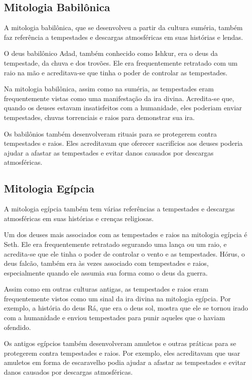 \documentclass[a4paper, 12pt, onecolumn,singlespacing]{article}
\begin{document}
	\subsection{Mitologia Babilônica}
	
	A mitologia babilônica, que se desenvolveu a partir da cultura suméria, também faz referência a tempestades e descargas atmosféricas em suas histórias e lendas.
	
	O deus babilônico Adad, também conhecido como Ishkur, era o deus da tempestade, da chuva e dos trovões. Ele era frequentemente retratado com um raio na mão e acreditava-se que tinha o poder de controlar as tempestades.
	
	Na mitologia babilônica, assim como na suméria, as tempestades eram frequentemente vistas como uma manifestação da ira divina. Acredita-se que, quando os deuses estavam insatisfeitos com a humanidade, eles poderiam enviar tempestades, chuvas torrenciais e raios para demonstrar sua ira.
	
	Os babilônios também desenvolveram rituais para se protegerem contra tempestades e raios. Eles acreditavam que oferecer sacrifícios aos deuses poderia ajudar a afastar as tempestades e evitar danos causados por descargas atmosféricas.
	
	\subsection{Mitologia Egípcia}
	
	A mitologia egípcia também tem várias referências a tempestades e descargas atmosféricas em suas histórias e crenças religiosas.
	
	Um dos deuses mais associados com as tempestades e raios na mitologia egípcia é Seth. Ele era frequentemente retratado segurando uma lança ou um raio, e acredita-se que ele tinha o poder de controlar o vento e as tempestades. Hórus, o deus falcão, também era às vezes associado com tempestades e raios, especialmente quando ele assumia sua forma como o deus da guerra.
	
	Assim como em outras culturas antigas, as tempestades e raios eram frequentemente vistos como um sinal da ira divina na mitologia egípcia. Por exemplo, a história do deus Rá, que era o deus sol, mostra que ele se tornou irado com a humanidade e enviou tempestades para punir aqueles que o haviam ofendido.
	
	Os antigos egípcios também desenvolveram amuletos e outras práticas para se protegerem contra tempestades e raios. Por exemplo, eles acreditavam que usar amuletos em forma de escaravelho podia ajudar a afastar as tempestades e evitar danos causados por descargas atmosféricas.
	
\end{document}
